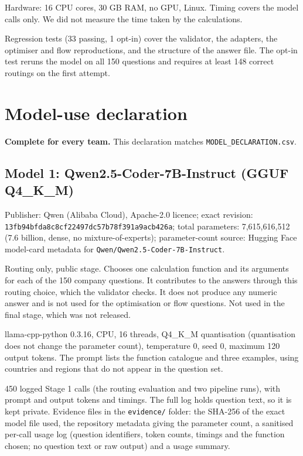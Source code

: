 \documentclass[11pt,a4paper]{article}
\begin{document}
Hardware: 16 CPU cores, 30 GB RAM, no GPU, Linux. Timing covers the model calls only. We did not measure the time taken by the calculations.

Regression tests (33 passing, 1 opt-in) cover the validator, the adapters, the
optimiser and flow reproductions, and the structure of the answer file. The
opt-in test reruns the model on all 150 questions and requires at least 148
correct routings on the first attempt.

\section{Model-use declaration}
\textbf{Complete for every team.} This declaration matches
\texttt{MODEL\_DECLARATION.csv}.

\subsection*{Model 1: Qwen2.5-Coder-7B-Instruct (GGUF Q4\_K\_M)}
\begin{description}[style=nextline]
  \item[Identity and size] Publisher: Qwen (Alibaba Cloud), Apache-2.0 licence;
    exact revision: \nolinkurl{13fb94bfda8c8cf22497dc57b78f391a9acb426a}; total
    parameters: 7,615,616,512 (7.6 billion, dense, no mixture-of-experts);
    parameter-count source: Hugging Face model-card metadata for
    \nolinkurl{Qwen/Qwen2.5-Coder-7B-Instruct}.
  \item[Role and stage] Routing only, public stage. Chooses one calculation
    function and its arguments for each of the 150 company questions. It
    contributes to the answers through this routing choice, which the validator
    checks. It does not produce any numeric answer and is not used for the
    optimisation or flow questions. Not used in the final stage, which was not
    released.
  \item[Configuration] llama-cpp-python 0.3.16, CPU, 16 threads, Q4\_K\_M
    quantisation (quantisation does not change the parameter count),
    temperature 0, seed 0, maximum 120 output tokens. The prompt lists the
    function catalogue and three examples, using countries and regions that do not appear in the question set.
  \item[Usage and evidence] 450 logged Stage 1 calls (the routing evaluation and two pipeline runs), with prompt and output tokens and timings. The
    full log holds question text, so it is kept private. Evidence files in the
    \texttt{evidence/} folder: the SHA-256 of the exact model file used, the
    repository metadata giving the parameter count, a sanitised per-call usage log
    (question identifiers, token counts, timings and the function chosen; no question
    text or raw output) and a usage summary.
\end{description}
\end{document}

